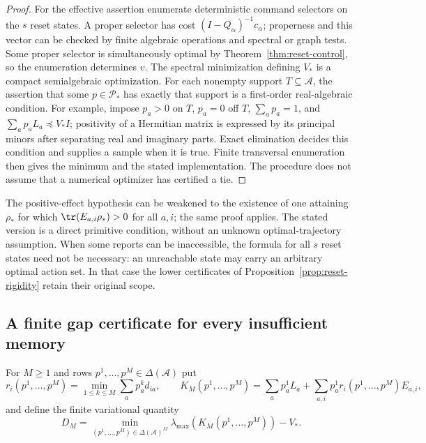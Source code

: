 \begin{proof}
For the effective assertion enumerate deterministic command selectors
on the $s$ reset states.  A proper selector has cost
$(I-Q_\alpha)^{-1}c_\alpha$; properness and this vector can be checked
by finite algebraic operations and spectral or graph tests.  Some
proper selector is simultaneously optimal by
Theorem~\ref{thm:reset-control}, so the enumeration determines $v$.
The spectral minimization defining $V_*$ is a compact semialgebraic
optimization.  For each nonempty support $T\subseteq\mathcal A$,
the assertion that some $p\in\mathcal P_*$ has exactly that support
is a first-order real-algebraic condition.  For example, impose
$p_a>0$ on $T$, $p_a=0$ off $T$, $\sum_a p_a=1$, and
$\sum_a p_aL_a\preccurlyeq V_*I$; positivity of a Hermitian matrix
is expressed by its principal minors after separating real and
imaginary parts.  Exact elimination decides this condition and
supplies a sample when it is true.  Finite transversal enumeration
then gives the minimum and the stated implementation.  The procedure
does not assume that a numerical optimizer has certified a tie.
\end{proof}

The positive-effect hypothesis can be weakened to the existence of one
attaining $\rho_*$ for which $\tr(E_{a,i}\rho_*)>0$ for all $a,i$;
the same proof applies.  The stated version is a direct primitive
condition, without an unknown optimal-trajectory assumption.  When
some reports can be inaccessible, the formula for all $s$ reset
states need not be necessary: an unreachable state may carry an
arbitrary optimal action set.  In that case the lower certificates
of Proposition~\ref{prop:reset-rigidity} retain their original scope.

\subsection{A finite gap certificate for every insufficient memory}

For $M\ge1$ and rows $p^1,\ldots,p^M\in\Delta(\mathcal A)$ put
\[
 r_i(p^1,\ldots,p^M)=\min_{1\le k\le M}\sum_a p^k_a d_{ia},
 \qquad
 K_M(p^1,\ldots,p^M)=\sum_a p^1_aL_a
       +\sum_{a,i}p^1_a r_i(p^1,\ldots,p^M)E_{a,i},
\]
and define the finite variational quantity
\begin{equation}\label{eq:r77-reset-gap}
 D_M=\min_{(p^1,\ldots,p^M)\in\Delta(\mathcal A)^M}
                  \lambda_{\max}(K_M(p^1,\ldots,p^M))-V_*.
\end{equation}

